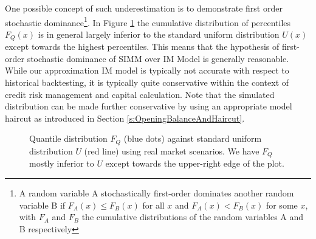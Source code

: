 \documentclass[preprint,12pt]{elsarticle}
\begin{document}
One possible concept of such underestimation is to demonstrate first order stochastic dominance\footnote{A random variable A stochastically first-order dominates another random variable B if $F_A (x) \le F_B(x)$ for all $x$ and $F_A(x) < F_B(x)$ for some $x$, with $F_A$ and $F_B$ the cumulative distributions of the random variables A and B respectively\cite{Quirk:1962}}. In Figure \ref{fig:FirstOrderTestResults} the
cumulative distribution of percentiles $F_Q(x)$ is in general largely inferior to the standard uniform distribution $U(x)$ except towards the highest percentiles. This means that
the hypothesis of first-order stochastic dominance of SIMM over IM Model is generally
reasonable. While our approximation IM model is typically not accurate with respect to historical backtesting, it is typically quite conservative within the context of credit risk management and capital calculation. Note that the simulated distribution can be made further conservative by using an appropriate model haircut as introduced in Section \ref{s:OpeningBalanceAndHaircut}.

\begin{figure}[h] 
\hfill
{}
\hfill
{}
\caption{Quantile distribution $F_{Q}$ (blue dots) against standard uniform distribution $U$ (red line) using real market scenarios. We have $F_{Q}$ mostly inferior to $U$ except towards the upper-right edge of the plot.} 
\label{fig:FirstOrderTestResults}
\end{figure}
\end{document}
